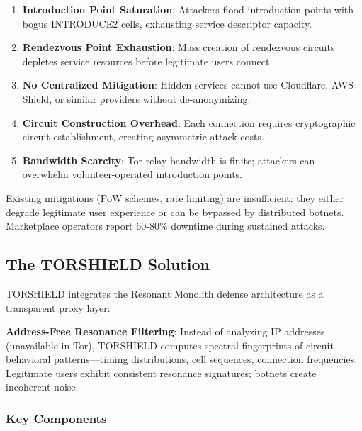 \documentclass[11pt,a4paper]{article}
\begin{document}
\begin{enumerate}[leftmargin=*]
\item \textbf{Introduction Point Saturation}: Attackers flood introduction points with bogus INTRODUCE2 cells, exhausting service descriptor capacity.
\item \textbf{Rendezvous Point Exhaustion}: Mass creation of rendezvous circuits depletes service resources before legitimate users connect.
\item \textbf{No Centralized Mitigation}: Hidden services cannot use Cloudflare, AWS Shield, or similar providers without de-anonymizing.
\item \textbf{Circuit Construction Overhead}: Each connection requires cryptographic circuit establishment, creating asymmetric attack costs.
\item \textbf{Bandwidth Scarcity}: Tor relay bandwidth is finite; attackers can overwhelm volunteer-operated introduction points.
\end{enumerate}

Existing mitigations (PoW schemes, rate limiting) are insufficient: they either degrade legitimate user experience or can be bypassed by distributed botnets. Marketplace operators report 60-80\% downtime during sustained attacks.

\subsection{The TORSHIELD Solution}

TORSHIELD integrates the Resonant Monolith defense architecture as a transparent proxy layer:

\begin{tcolorbox}[colback=blue!5!white,colframe=blue!75!black,title=TORSHIELD Core Innovation]
\textbf{Address-Free Resonance Filtering}: Instead of analyzing IP addresses (unavailable in Tor), TORSHIELD computes spectral fingerprints of circuit behavioral patterns---timing distributions, cell sequences, connection frequencies. Legitimate users exhibit consistent resonance signatures; botnets create incoherent noise.
\end{tcolorbox}

\subsubsection{Key Components}
\end{document}
